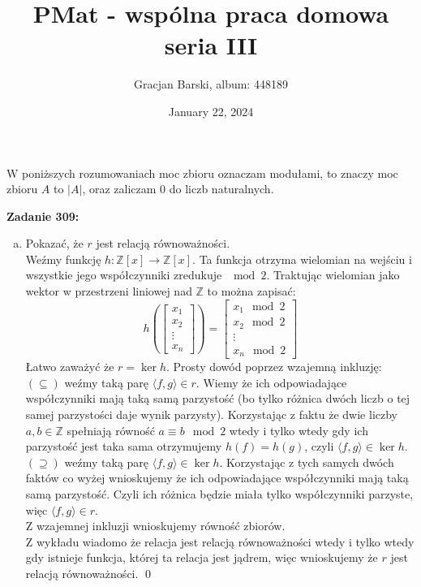 \documentclass[10pt]{article}
\title{PMat - wspólna praca domowa seria III}
\author{Gracjan Barski, album: 448189}
\date{January 22, 2024}
\newcommand{\Z}{\mathbb{Z}}
\begin{document}
\maketitle
\begin{center}
    W poniższych rozumowaniach moc zbioru oznaczam modułami, to znaczy moc zbioru $A$ to $|A|$, oraz zaliczam $0$ do liczb naturalnych.
\end{center}
\textbf{Zadanie 309:}
\begin{enumerate}[a)]
    \item Pokazać, że $r$ jest relacją równoważności. \\[10pt]
    Weźmy funkcję $h \colon \Z [x] \to \Z [x]$. Ta funkcja otrzyma wielomian na wejściu i wszystkie jego współczynniki zredukuje $\mod 2$. Traktując wielomian jako wektor w przestrzeni liniowej nad $\Z$ to można zapisać:
    $$h\left(\begin{bmatrix}
        x_1 \\
        x_2 \\
        \vdots \\
        x_n
    \end{bmatrix}\right) = \begin{bmatrix}
        x_1 \mod 2 \\
        x_2 \mod 2\\
        \vdots \\
        x_n \mod 2
    \end{bmatrix}$$
    Łatwo zaważyć że $r = \ker h$. Prosty dowód poprzez wzajemną inkluzję: \\[5pt]
    $(\subseteq)$ weźmy taką parę $\langle f, g \rangle \in r$. Wiemy że ich odpowiadające współczynniki mają taką samą parzystość (bo tylko różnica dwóch liczb o tej samej parzystości daje wynik parzysty). Korzystając z faktu że dwie liczby $a,b \in \Z$ spełniają równość $a \equiv b \mod 2$ wtedy i tylko wtedy gdy ich parzystość jest taka sama otrzymujemy $h(f) = h(g)$, czyli $\langle f, g \rangle \in \ker h$. \\[5pt]
    $(\supseteq)$ weźmy taką parę $\langle f, g \rangle \in \ker h$. Korzystając z tych samych dwóch faktów co wyżej wnioskujemy że ich odpowiadające współczynniki mają taką samą parzystość. Czyli ich różnica będzie miała tylko współczynniki parzyste, więc $\langle f, g \rangle \in r$. \\[5pt]
    Z wzajemnej inkluzji wnioskujemy równość zbiorów. \\[5pt]
    Z wykładu wiadomo że relacja jest relacją równoważności wtedy i tylko wtedy gdy istnieje funkcja, której ta relacja jest jądrem, więc wnioskujemy że $r$ jest relacją równoważności. \qed
    \vspace{10pt}
    

\end{enumerate}
\end{document}
